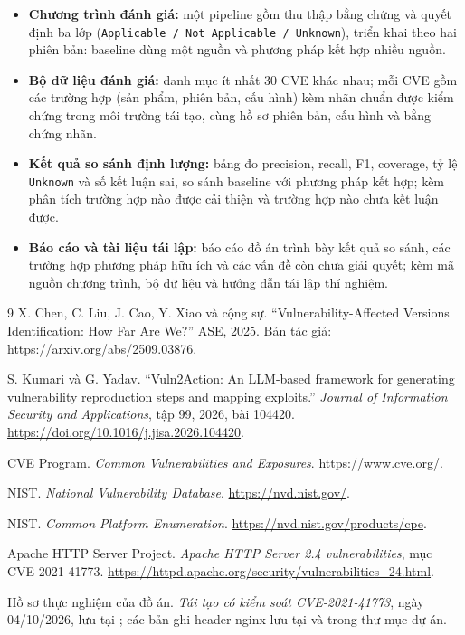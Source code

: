\documentclass[11pt,a4paper]{article}
\begin{document}
\begin{itemize}
  \item \textbf{Chương trình đánh giá:} một pipeline gồm thu thập bằng chứng và quyết định ba lớp (\texttt{Applicable / Not Applicable / Unknown}), triển khai theo hai phiên bản: baseline dùng một nguồn và phương pháp kết hợp nhiều nguồn.
  \item \textbf{Bộ dữ liệu đánh giá:} danh mục ít nhất 30 CVE khác nhau; mỗi CVE gồm các trường hợp (sản phẩm, phiên bản, cấu hình) kèm nhãn chuẩn được kiểm chứng trong môi trường tái tạo, cùng hồ sơ phiên bản, cấu hình và bằng chứng nhãn.
  \item \textbf{Kết quả so sánh định lượng:} bảng đo precision, recall, F1, coverage, tỷ lệ \texttt{Unknown} và số kết luận sai, so sánh baseline với phương pháp kết hợp; kèm phân tích trường hợp nào được cải thiện và trường hợp nào chưa kết luận được.
  \item \textbf{Báo cáo và tài liệu tái lập:} báo cáo đồ án trình bày kết quả so sánh, các trường hợp phương pháp hữu ích và các vấn đề còn chưa giải quyết; kèm mã nguồn chương trình, bộ dữ liệu và hướng dẫn tái lập thí nghiệm.
\end{itemize}

\begin{thebibliography}{9}
\small
{} X. Chen, C. Liu, J. Cao, Y. Xiao và cộng sự. ``Vulnerability-Affected Versions Identification: How Far Are We?'' ASE, 2025. Bản tác giả: \url{https://arxiv.org/abs/2509.03876}.

 S. Kumari và G. Yadav. ``Vuln2Action: An LLM-based framework for generating vulnerability reproduction steps and mapping exploits.'' \emph{Journal of Information Security and Applications}, tập 99, 2026, bài 104420. \url{https://doi.org/10.1016/j.jisa.2026.104420}.

 CVE Program. \emph{Common Vulnerabilities and Exposures}. \url{https://www.cve.org/}.

 NIST. \emph{National Vulnerability Database}. \url{https://nvd.nist.gov/}.

 NIST. \emph{Common Platform Enumeration}. \url{https://nvd.nist.gov/products/cpe}.

 Apache HTTP Server Project. \emph{Apache HTTP Server 2.4 vulnerabilities}, mục CVE-2021-41773. \url{https://httpd.apache.org/security/vulnerabilities_24.html}.

 Hồ sơ thực nghiệm của đồ án. \emph{Tái tạo có kiểm soát CVE-2021-41773}, ngày 04/10/2026, lưu tại ; các bản ghi header nginx lưu tại  và  trong thư mục dự án.
\end{thebibliography}
\end{document}

